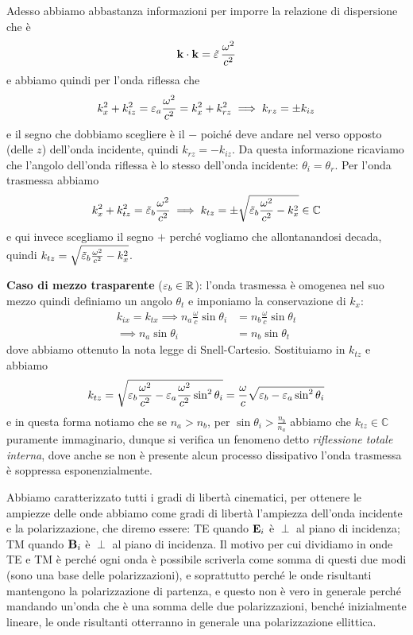 Adesso abbiamo abbastanza informazioni per 
imporre la relazione di dispersione che è 
\begin{align}
  \mathbf{k} \cdot \mathbf{k} = \tilde{\varepsilon}\, \frac{\omega^2}{c^2}
\end{align}
e abbiamo quindi per l'onda riflessa che 
\begin{align}
  k_x^2 + k_{iz}^2 = \varepsilon_a \frac{\omega^2}{c^2} = k_x^2 + k_{rz}^2  \implies k_{rz} = \pm k_{iz}
\end{align}
e il segno che dobbiamo scegliere è il $ - $ poiché deve andare nel verso opposto (delle $ z $) dell'onda incidente, quindi $ k_{rz} = -k_{iz} $. 
Da questa informazione ricaviamo che l'angolo dell'onda riflessa è lo stesso dell'onda incidente: $ \theta_i = \theta_r $.
Per l'onda trasmessa abbiamo
\begin{align}
  k_x^2 + k_{tz}^2 = \tilde{\varepsilon}_b \frac{\omega^2}{c^2} \implies k_{tz} = \pm \sqrt{\tilde{\varepsilon}_b \frac{\omega^2}{c^2} - k_x^2} \in \mathbb{C}
\end{align}
e qui invece scegliamo il segno $ + $ perché vogliamo che allontanandosi decada, quindi $ k_{tz} = \sqrt{\tilde{\varepsilon}_b \frac{\omega^2}{c^2} - k_x^2} $.

\textbf{Caso di mezzo trasparente} ($ \varepsilon_b \in \mathbb{R} $): l'onda trasmessa è omogenea nel suo mezzo quindi definiamo un angolo $ \theta_t $ e 
imponiamo la conservazione di $ k_x $:
\begin{align}
  k_{ix} = k_{tx} \implies n_a \frac{\omega}{c} \sin\theta_i &= n_b \frac{\omega}{c} \sin\theta_t 
  \\
  \implies n_a \sin\theta_i &= n_b \sin\theta_t \tag*{[Legge di Snell]}
\end{align}
dove abbiamo ottenuto la nota legge di Snell-Cartesio. Sostituiamo in $ k_{tz} $ e abbiamo
\begin{align}
  k_{tz} = \sqrt{{\varepsilon}_b \frac{\omega^2}{c^2} - \varepsilon_a \frac{\omega^2}{c^2}\sin^2\theta_i}= \frac{\omega}{c}\sqrt{{\varepsilon}_b - \varepsilon_a\sin^2\theta_i } 
\end{align}
e in questa forma notiamo che se $ n_a > n_b $, per $ \sin\theta_i > \frac{n_b}{n_a} $ abbiamo che $ k_{tz} \in \mathbb{C} $ puramente immaginario, dunque 
si verifica un fenomeno detto \textit{riflessione totale interna}, dove anche se non è presente alcun processo dissipativo l'onda trasmessa è soppressa 
esponenzialmente.

Abbiamo caratterizzato tutti i gradi di libertà cinematici, per ottenere le ampiezze delle onde abbiamo come gradi di libertà l'ampiezza dell'onda incidente 
e la polarizzazione, che diremo essere: TE quando $ \mathbf{E}_i $ è $ \perp $ al piano di incidenza; TM quando $ \mathbf{B}_i $ è $ \perp $ al piano di incidenza. 
Il motivo per cui dividiamo in onde TE e TM è perché ogni onda è possibile scriverla come somma di questi due modi (sono una base delle polarizzazioni), 
e soprattutto perché le onde risultanti mantengono la polarizzazione di partenza, e questo non è vero in generale perché mandando un'onda che è una somma 
delle due polarizzazioni, benché inizialmente lineare, le onde risultanti otterranno in generale una polarizzazione ellittica.

